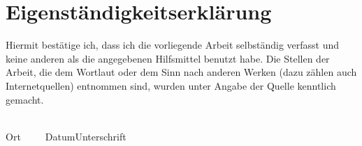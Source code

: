 \section*{Eigenständigkeitserklärung}
Hiermit bestätige ich, dass ich die vorliegende Arbeit selbständig verfasst
und keine anderen als die angegebenen Hilfsmittel benutzt habe. Die Stellen
der Arbeit, die dem Wortlaut oder dem Sinn nach anderen Werken (dazu zählen
auch Internetquellen) entnommen sind, wurden unter Angabe der Quelle kenntlich
gemacht.

\vspace{3cm}
\noindent
\underline{\hspace{4cm}}\hfill\underline{\hspace{6.6cm}}\\
Ort~~~~~Datum\hfill Unterschrift\hspace{4cm}
